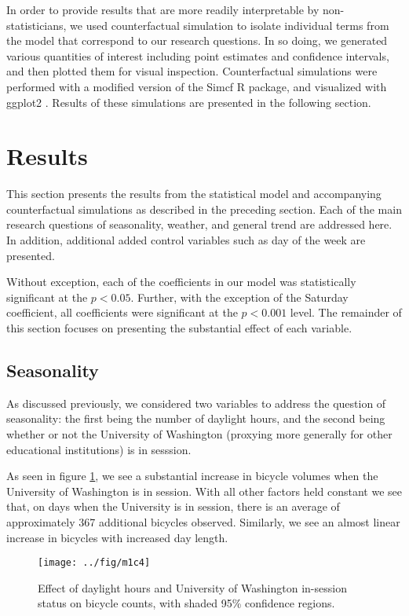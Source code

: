\documentclass[12pt,letterpaper,article]{memoir} %
\begin{document}
In order to provide results that are more readily interpretable by
non-statisticians, we used counterfactual simulation to isolate
individual terms from the model that correspond to our research
questions. In so doing, we generated various quantities of interest
including point estimates and confidence intervals, and then plotted
them for visual inspection. Counterfactual simulations were performed
with a modified version of the Simcf R package, and visualized with
ggplot2 \parencite{Adolph:2014aa,Schmiedeskamp:aa,Wickham:2009aa}.
Results of these simulations are presented in the following section.

\section*{Results}
% 
% 
This section presents the results from the statistical model and
accompanying counterfactual simulations as described in the preceding
section. Each of the main research questions of seasonality, weather,
and general trend are addressed here. In addition, additional added
control variables such as day of the week are presented.

Without exception, each of the coefficients in our model was
statistically significant at the $p < 0.05$. Further, with the
exception of the Saturday coefficient, all coefficients were
significant at the $p < 0.001$ level. The remainder of this section
focuses on presenting the substantial effect of each variable.

\subsection*{Seasonality}
As discussed previously, we considered two variables to address the
question of seasonality: the first being the number of daylight hours,
and the second being whether or not the University of Washington
(proxying more generally for other educational institutions) is in
sesssion.

As seen in figure \ref{fg:seasonality}, we see a substantial increase
in bicycle volumes when the University of Washington is in session.
With all other factors held constant we see that, on days when the
University is in session, there is an average of approximately 367
additional bicycles observed. Similarly, we see an almost linear
increase in bicycles with increased day length.

\begin{figure}[h!]
  \centering
  \texttt{[image: ../fig/m1c4]}
  \caption{Effect of daylight hours and University of Washington
    in-session status on bicycle counts, with shaded 95\% confidence
    regions.}
  \label{fg:seasonality}
\end{figure}
\end{document}
